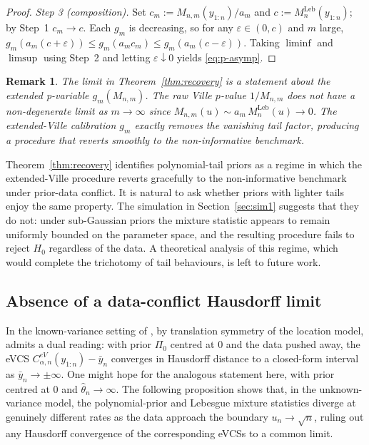 \documentclass[numsec,webpdf,modern,medium,namedate]{oup-authoring-template}
\theoremstyle{thmstyleone}%
\theoremstyle{thmstyletwo}%
\newtheorem{remark}{Remark}%
\theoremstyle{thmstylethree}%
\newcommand{\Leb}{\mathrm{Leb}}
\newcommand{\1}{\mathbf{1}}
\begin{document}
\begin{proof}
\emph{Step 3 (composition).}
Set \(c_m:=M_{n,m}(y_{1:n})/a_m\) and \(c:=M_n^{\Leb}(y_{1:n})\); by Step~1 \(c_m\to c\). Each \(g_m\) is decreasing, so for any \(\varepsilon\in(0,c)\) and \(m\) large, \(g_m(a_m(c+\varepsilon))\leq g_m(a_m c_m)\leq g_m(a_m(c-\varepsilon))\). Taking \(\liminf\) and \(\limsup\) using Step~2 and letting \(\varepsilon\downarrow 0\) yields \eqref{eq:p-asymp}.
\end{proof}

\begin{remark}
The limit in Theorem~\ref{thm:recovery} is a statement about the
extended p-variable \(g_m(M_{n,m})\). The raw Ville $p$-value
\(1/M_{n,m}\) does not have a non-degenerate limit as $m \to \infty$ since
\(M_{n,m}(u)\sim a_m\,M_n^{\Leb}(u)\to 0\). The extended-Ville
calibration \(g_m\) exactly removes the vanishing tail factor,
producing a procedure that reverts smoothly to the non-informative benchmark.
\end{remark}

Theorem~\ref{thm:recovery} identifies polynomial-tail priors as a regime in which the extended-Ville procedure reverts gracefully to the non-informative benchmark under prior-data conflict. It is natural to ask whether priors with lighter tails enjoy the same property. The simulation in Section~\ref{sec:sim1} suggests that
they do not: under sub-Gaussian priors the mixture statistic appears to remain
uniformly bounded on the parameter space, and the resulting procedure fails to reject \(H_0\) regardless of the data. A theoretical analysis of this regime, which would complete the trichotomy of tail behaviours, is left to future work.

\subsection{Absence of a data-conflict Hausdorff limit}
In the known-variance setting of \cite{Cortinovis2025}, by translation symmetry of the location model, \cite[Theorem~4.3]{Cortinovis2025} admits a dual reading: with prior \(\Pi_0\) centred at \(0\) and the data pushed away, the eVCS \(C^{eV}_{\alpha,n}(y_{1:n})-\bar y_n\) converges in Hausdorff distance to a closed-form interval as \(\bar y_n\to\pm\infty\). One might hope for the analogous statement here, with prior centred at \(0\) and \(\widehat\theta_n\to\infty\). The following proposition shows that, in the unknown-variance model, the polynomial-prior and Lebesgue mixture statistics diverge at genuinely different rates as the data approach the boundary \(u_n\to\sqrt n\), ruling out any Hausdorff convergence of the corresponding eVCSs to a common limit.
\end{document}
